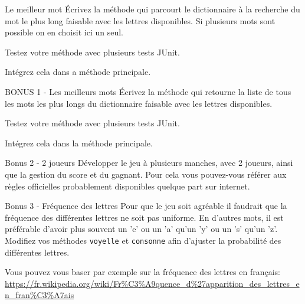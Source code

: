 \documentclass[a4paper,11pt]{style-esi/td}
\begin{document}
 	\begin{Exercice}{Le meilleur mot}
 	 	\'Ecrivez la méthode 
		qui parcourt le dictionnaire à la recherche du mot le plus long faisable 
		avec les lettres disponibles. 
		Si plusieurs mots sont possible on en choisit ici un seul.

		Testez votre méthode avec plusieurs tests JUnit.

		 Intégrez cela dans a méthode principale.
	\end{Exercice}

 	\begin{Exercice}{BONUS 1 - Les meilleurs mots}
 	 	\'Ecrivez la méthode 
		qui retourne la liste de tous les mots les plus longs du dictionnaire 
		faisable avec les lettres disponibles.

		Testez votre méthode avec plusieurs tests JUnit.

		Intégrez cela dans la méthode principale.
	\end{Exercice}


 	\begin{Exercice}{Bonus 2 - 2 joueurs}
		Développer le jeu à plusieurs manches, avec 2 joueurs, 
		ainsi que la gestion du score et du gagnant.
		Pour cela vous pouvez-vous référer aux règles officielles probablement 
		disponibles quelque part sur internet.
	\end{Exercice}
		
 	\begin{Exercice}{Bonus 3 - Fréquence des lettres}
		Pour que le jeu soit agréable il faudrait que la fréquence des différentes
		lettres ne soit pas uniforme. En d'autres mots, il est préférable d'avoir plus
		souvent un 'e' ou un 'a' qu'un 'y' ou un 's' qu'un 'z'. Modifiez vos méthodes
		\texttt{voyelle} et \texttt{consonne} afin d'ajuster la probabilité des
		différentes lettres. 
		
		Vous pouvez vous baser par exemple sur la fréquence des lettres en français:
		 \url{https://fr.wikipedia.org/wiki/Fr%C3%A9quence_d%27apparition_des_lettres_en_fran%C3%A7ais}
	\end{Exercice}
		
\end{document}
